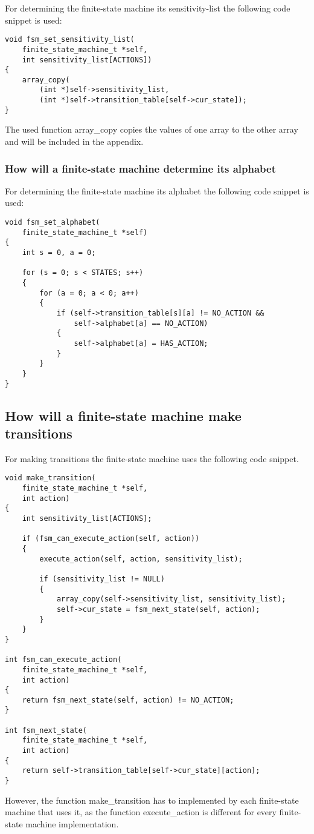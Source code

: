 For determining the finite-state machine its sensitivity-list the
following code snippet is used:

\begin{verbatim}
void fsm_set_sensitivity_list(
    finite_state_machine_t *self,
    int sensitivity_list[ACTIONS])
{
    array_copy(
        (int *)self->sensitivity_list, 
        (int *)self->transition_table[self->cur_state]);
}
\end{verbatim}

The used function array\_copy copies the values of one array to the
other array and will be included in the appendix.

\hypertarget{how-will-a-finite-state-machine-determine-its-alphabet}{%
\subsubsection{How will a finite-state machine determine its
alphabet}\label{how-will-a-finite-state-machine-determine-its-alphabet}}

For determining the finite-state machine its alphabet the following code
snippet is used:

\begin{verbatim}
void fsm_set_alphabet(
    finite_state_machine_t *self)
{
    int s = 0, a = 0;

    for (s = 0; s < STATES; s++)
    {
        for (a = 0; a < 0; a++)
        {
            if (self->transition_table[s][a] != NO_ACTION &&
                self->alphabet[a] == NO_ACTION)
            {
                self->alphabet[a] = HAS_ACTION;
            }
        }
    }
}
\end{verbatim}

\hypertarget{how-will-a-finite-state-machine-make-transitions}{%
\subsection{How will a finite-state machine make
transitions}\label{how-will-a-finite-state-machine-make-transitions}}

For making transitions the finite-state machine uses the following code
snippet.

\begin{verbatim}
void make_transition(
    finite_state_machine_t *self,
    int action)
{
    int sensitivity_list[ACTIONS];

    if (fsm_can_execute_action(self, action))
    {
        execute_action(self, action, sensitivity_list);

        if (sensitivity_list != NULL)
        {
            array_copy(self->sensitivity_list, sensitivity_list);
            self->cur_state = fsm_next_state(self, action);
        }
    }
}

int fsm_can_execute_action(
    finite_state_machine_t *self,
    int action)
{
    return fsm_next_state(self, action) != NO_ACTION;
}

int fsm_next_state(
    finite_state_machine_t *self,
    int action)
{
    return self->transition_table[self->cur_state][action];
}
\end{verbatim}

However, the function make\_transition has to implemented by each
finite-state machine that uses it, as the function execute\_action is
different for every finite-state machine implementation.
